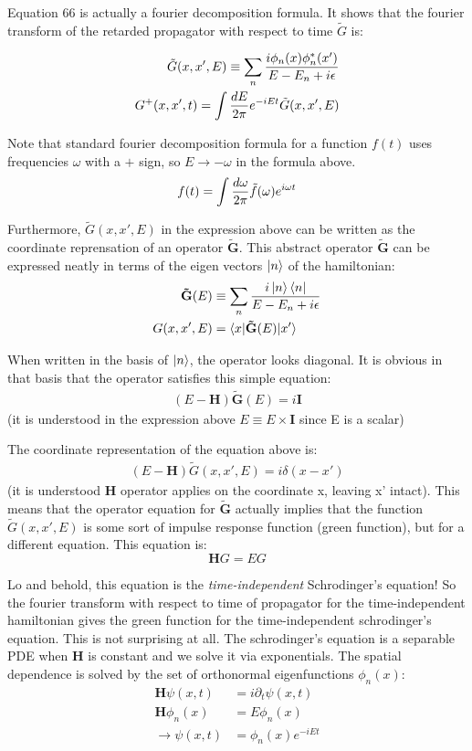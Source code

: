 \documentclass[11pt]{article}
\theoremstyle{definition}
\begin{document}
Equation 66 is actually a fourier decomposition formula.  It shows that the fourier transform of the retarded propagator with respect to time $\tilde{G}$ is:

\begin{align}
\tilde{G}(x, x', E) \equiv \sum_n {i \phi_n(x) \phi_n^*(x') \over E - E_n + i \epsilon} \\
G^+(x, x', t) = \int {dE \over 2 \pi} e^{-i E t} \tilde{G}(x, x', E) 
\end{align}

Note that standard fourier decomposition formula for a function $f(t)$ uses frequencies $\omega$ with a $+$ sign, so $E \rightarrow -\omega$ in the formula above.
$$ f(t) = \int {d \omega \over 2 \pi} \tilde{f}(\omega) e^{i \omega t}$$

Furthermore, $\tilde{G}(x, x', E)$ in the expression above can be written as the coordinate reprensation of an operator $\mathbf{\tilde{G}}$.
This abstract operator $\mathbf{\tilde{G}}$ can be expressed neatly in terms of the eigen vectors $\ket{n}$ of the hamiltonian:
\begin{align}
\mathbf{\tilde{G}}(E) &\equiv \sum_{n} {i \ket{n} \bra{n} \over E - E_n + i \epsilon} \\
G(x, x', E) &= \braket{x| \mathbf{\tilde{G}}(E)| x'}
\end{align}

When written in the basis of $\ket{n}$, the operator looks diagonal.  It is obvious in that basis that the operator satisfies this simple equation:
\begin{align}
(E - \mathbf{H}) \mathbf{\tilde{G}}(E) =i \mathbf{I}
\end{align}
(it is understood in the expression above $E \equiv E \times \mathbf{I}$ since E is a scalar)

The coordinate representation of the equation above is:
\begin{align}
(E - \mathbf{H}) \tilde{G}(x, x', E) = i \delta(x - x')
\end{align}
(it is understood $\mathbf{H}$ operator applies on the coordinate x, leaving x' intact).  This means that the operator equation for $\mathbf{\tilde{G}}$ actually implies that the function $\tilde{G}(x, x', E)$ is some sort of impulse response function (green function), but for a different equation.  This equation is:
$$\mathbf{H} G = E G$$

Lo and behold, this equation is the \emph{time-independent} Schrodinger's equation!  So the fourier transform with respect to time of propagator for the time-independent hamiltonian gives the green function for the time-independent schrodinger's equation.
This is not surprising at all.  The schrodinger's equation is a separable PDE when $\mathbf{H}$ is constant and we solve it via exponentials.  The spatial dependence is solved by the set of orthonormal eigenfunctions $\phi_n(x)$: 
\begin{align}
\mathbf{H} \psi(x, t) &= i \partial_t \psi(x, t) \\
\mathbf{H} \phi_n(x) & = E \phi_n(x) \\
\rightarrow \psi(x, t) &= \phi_n(x) e^{-i E t} 
\end{align}
\end{document}
